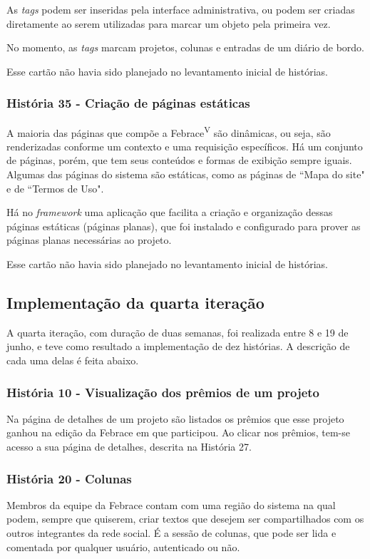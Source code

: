       As \textit{tags} podem ser inseridas pela interface administrativa, ou podem ser criadas diretamente ao serem utilizadas para marcar um objeto pela primeira vez.

      No momento, as \textit{tags} marcam projetos, colunas e entradas de um diário de bordo.

  Esse cartão não havia sido planejado no levantamento inicial de histórias.

    \subsubsection{História 35 - Criação de páginas estáticas}
      A maioria das páginas que compõe a Febrace\textsuperscript{V} são dinâmicas, ou seja, são renderizadas conforme um contexto e uma requisição específicos. Há um conjunto de páginas, porém, que tem seus conteúdos e formas de exibição sempre iguais. Algumas das páginas do sistema são estáticas, como as páginas de “Mapa do site" e de “Termos de Uso".

      Há no \textit{framework} uma aplicação que facilita a criação e organização dessas páginas estáticas (páginas planas), que foi instalado e configurado para prover as páginas planas necessárias ao projeto.

  Esse cartão não havia sido planejado no levantamento inicial de histórias.

  \subsection{Implementação da quarta iteração}
    A quarta iteração, com duração de duas semanas, foi realizada entre 8 e 19 de junho, e teve como resultado a implementação de dez histórias. A descrição de cada uma delas é feita abaixo.

    \subsubsection{História 10 - Visualização dos prêmios de um projeto}
      Na página de detalhes de um projeto são listados os prêmios que esse projeto ganhou na edição da Febrace em que participou. Ao clicar nos prêmios, tem-se acesso a sua página de detalhes, descrita na História 27.

    \subsubsection{História 20 - Colunas}
      Membros da equipe da Febrace contam com uma região do sistema na qual podem, sempre que quiserem, criar textos que desejem ser compartilhados com os outros integrantes da rede social. É a sessão de colunas, que pode ser lida e comentada por qualquer usuário, autenticado ou não.

